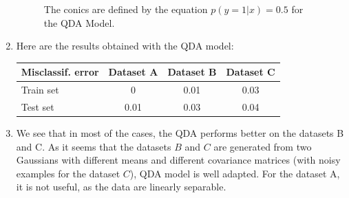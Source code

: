 \documentclass[a4paper, 11pt]{report}
\begin{document}
\begin{enumerate}[label=\alph*]
\begin{figure}[!htb]
          \label{fig:qda_c}
        \endminipage
        \caption{The conics are defined by the equation $p(y=1|x)=0.5$ for the QDA Model.}
        \label{fig:qda-plot}
        \end{figure}
        
    \item Here are the results obtained with the QDA model: \\
    
    \begin{tabular}{ | l | *{3}{| c} | }
         \hline
            Misclassif. error & Dataset A & Dataset B & Dataset C \\
         \hline
           Train set & 0    & 0.01 & 0.03 \\
           Test set  & 0.01 & 0.03 & 0.04 \\
         \hline
     \end{tabular}
     
     \item We see that in most of the cases, the QDA performs better on the datasets B and C. As it seems that the datasets $B$ and $C$ are generated from two Gaussians with different means and different covariance matrices (with noisy examples for the dataset $C$), QDA model is well adapted. For the dataset A, it is not useful, as the data are linearly separable.
\end{enumerate}
\end{document}
